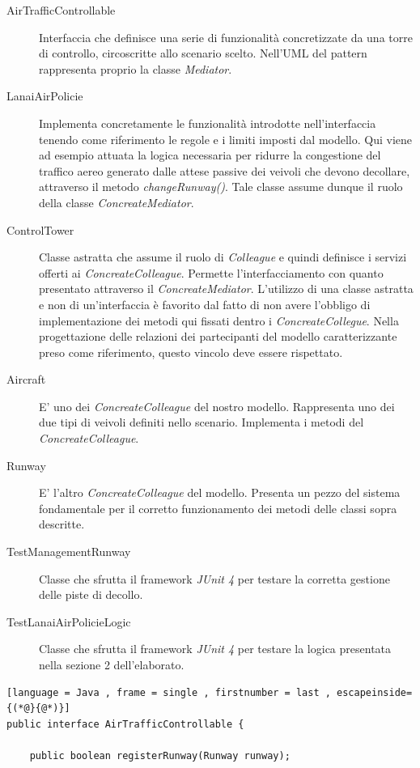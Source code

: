 \documentclass{article}
\begin{document}
\begin{sloppy}
\begin{description}
    \item[AirTrafficControllable]Interfaccia che definisce una serie di funzionalità concretizzate da una torre di controllo, circoscritte allo scenario scelto. Nell'UML del pattern rappresenta proprio la classe \textit{Mediator}.
    \item[LanaiAirPolicie]Implementa concretamente le funzionalità introdotte nell'interfaccia tenendo come riferimento le regole e i limiti imposti dal modello. Qui viene ad esempio attuata la logica necessaria per ridurre la congestione del traffico aereo generato dalle attese passive dei veivoli che devono decollare, attraverso il metodo \textit{changeRunway()}. Tale classe assume dunque il ruolo della classe \textit{ConcreateMediator}.
    \item[ControlTower]Classe astratta che assume il ruolo di \textit{Colleague} e quindi definisce i servizi offerti ai \textit{ConcreateColleague}. Permette l'interfacciamento con quanto presentato attraverso il \textit{ConcreateMediator}. L'utilizzo di una classe astratta e non di un'interfaccia è favorito dal fatto di non avere l'obbligo di implementazione dei metodi qui fissati dentro i \textit{ConcreateCollegue}. Nella progettazione delle relazioni dei partecipanti del modello caratterizzante preso come riferimento, questo vincolo deve essere rispettato. 
    \item[Aircraft]E' uno dei \textit{ConcreateColleague} del nostro modello. Rappresenta uno dei due tipi di veivoli definiti nello scenario. Implementa i metodi del \textit{ConcreateColleague}.
    \item[Runway]E' l'altro \textit{ConcreateColleague} del modello. Presenta un pezzo del sistema fondamentale per il corretto funzionamento dei metodi delle classi sopra descritte.
    \item[TestManagementRunway]Classe che sfrutta il framework \textit{JUnit 4} per testare la corretta gestione delle piste di decollo.
    \item[TestLanaiAirPolicieLogic]Classe che sfrutta il framework \textit{JUnit 4} per testare la logica presentata nella sezione 2 dell'elaborato.
\end{description}

\begin{lstlisting}[language = Java , frame = single , firstnumber = last , escapeinside={(*@}{@*)}]
public interface AirTrafficControllable {

	public boolean registerRunway(Runway runway);
	

\end{lstlisting}
\end{sloppy}
\end{document}

